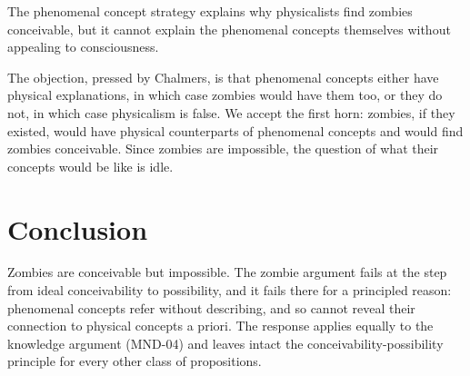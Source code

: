 \documentclass{situationist-preprint}
\begin{document}
\begin{objection}
The phenomenal concept strategy explains why physicalists find zombies conceivable, but it cannot explain the phenomenal concepts themselves without appealing to consciousness.
\end{objection}

\begin{reply}
The objection, pressed by Chalmers, is that phenomenal concepts either have physical explanations, in which case zombies would have them too, or they do not, in which case physicalism is false. We accept the first horn: zombies, if they existed, would have physical counterparts of phenomenal concepts and would find zombies conceivable. Since zombies are impossible, the question of what their concepts would be like is idle.
\end{reply}

\section{Conclusion}

Zombies are conceivable but impossible. The zombie argument fails at the step from ideal conceivability to possibility, and it fails there for a principled reason: phenomenal concepts refer without describing, and so cannot reveal their connection to physical concepts a priori. The response applies equally to the knowledge argument (MND-04) and leaves intact the conceivability-possibility principle for every other class of propositions.
\end{document}
